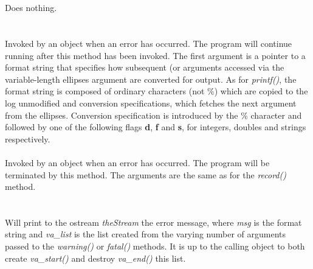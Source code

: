  \\
\\ 
Does nothing. \\

  \\
\\
Invoked by an object when an error has occurred. The program will
continue running after this method has been invoked. The first
argument is a pointer to a format string that specifies how
subsequent (or arguments accessed via the variable-length ellipses
argument are converted for output. As for {\em printf()}, the format
string is composed of ordinary characters (not \%) which are copied to
the log unmodified and conversion specifications, which fetches the
next argument from the ellipses. Conversion specification is
introduced by the \% character and followed by one of the following
flags {\bf d}, {\bf f} and {\bf s}, for integers, doubles and strings
respectively. \\


\\ 
Invoked by an object when an error has occurred. The program will be
terminated by this method. The arguments are the same as for the {\em
record()} method.\\ 

  \\
\\ 
Will print to the ostream {\em theStream} the error message, where
{\em msg} is the format string  and {\em va\_list} is the list created
from the varying number of arguments passed to the {\em warning()} or
{\em fatal()} methods. It is up to the calling object to both create
{\em va\_start()} and destroy {\em va\_end()} this list. 

